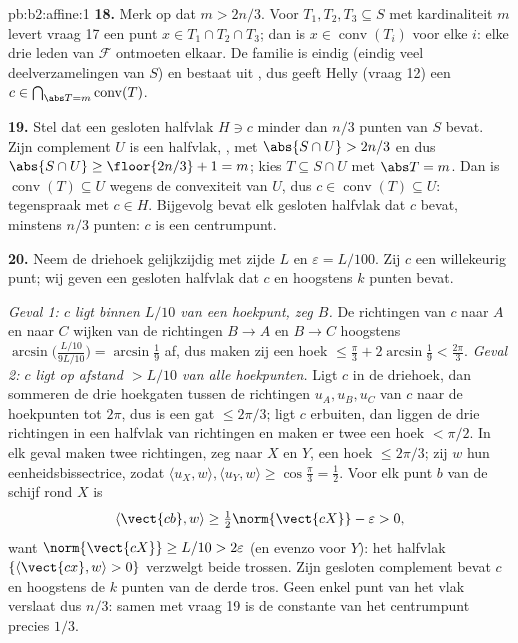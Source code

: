 \begin{solution}{pb:b2:affine:1}
\textbf{18.} Merk op dat $m > 2n/3$. Voor $T_1, T_2, T_3 \subseteq
S$ met kardinaliteit $m$ levert vraag 17 een punt $x \in T_1 \cap
T_2 \cap T_3$; dan is $x \in \operatorname{conv}(T_i)$ voor elke
$i$: elke drie leden van $\mathcal F$ ontmoeten elkaar. De familie
is eindig (eindig veel deelverzamelingen van $S$) en bestaat uit
, dus geeft Helly (vraag 12) een $c \in
\bigcap_{\abs T = m}\operatorname{conv}(T)$.

\textbf{19.} Stel dat een gesloten halfvlak $H \ni c$ minder dan
$n/3$ punten van $S$ bevat. Zijn complement $U$ is een 
halfvlak, , met $\abs{S \cap U} > 2n/3$ en dus $\abs{S \cap
U} \geq \floor{2n/3} + 1 = m$; kies $T \subseteq S \cap U$ met
$\abs T = m$. Dan is $\operatorname{conv}(T) \subseteq U$ wegens de
convexiteit van $U$, dus $c \in \operatorname{conv}(T) \subseteq
U$: tegenspraak met $c \in H$. Bijgevolg bevat elk gesloten
halfvlak dat $c$ bevat, minstens $n/3$ punten: $c$ is een
centrumpunt.

\textbf{20.} Neem de driehoek gelijkzijdig met zijde $L$ en
$\varepsilon = L/100$. Zij $c$ een willekeurig punt; wij geven een
gesloten halfvlak dat $c$ en hoogstens $k$ punten bevat.

\emph{Geval 1: $c$ ligt binnen $L/10$ van een hoekpunt, zeg $B$.}
De richtingen van $c$ naar $A$ en naar $C$ wijken van de richtingen
$B \to A$ en $B \to C$ hoogstens
$\arcsin\bigl(\tfrac{L/10}{9L/10}\bigr) = \arcsin\tfrac19$ af, dus
maken zij een hoek $\leq \tfrac\pi3 + 2\arcsin\tfrac19 <
\tfrac{2\pi}3$. \emph{Geval 2: $c$ ligt op afstand $> L/10$ van
alle hoekpunten.} Ligt $c$ in de driehoek, dan sommeren de drie
hoekgaten tussen de richtingen $u_A, u_B, u_C$ van $c$ naar de
hoekpunten tot $2\pi$, dus is een gat $\leq 2\pi/3$; ligt $c$
erbuiten, dan liggen de drie richtingen in een  halfvlak van
richtingen en maken er twee een hoek $< \pi/2$. In elk geval maken
twee richtingen, zeg naar $X$ en $Y$, een hoek $\leq 2\pi/3$; zij
$w$ hun eenheidsbissectrice, zodat $\langle u_X, w\rangle, \langle
u_Y, w\rangle \geq \cos\tfrac\pi3 = \tfrac12$. Voor elk punt $b$
van de schijf rond $X$ is
\[
\langle \vect{cb}, w\rangle \geq
\tfrac12\norm{\vect{cX}} - \varepsilon > 0,
\]
want $\norm{\vect{cX}} \geq L/10 > 2\varepsilon$ (en evenzo voor
$Y$): het  halfvlak $\{\langle \vect{cx}, w\rangle > 0\}$
verzwelgt beide trossen. Zijn gesloten complement bevat $c$ en
hoogstens de $k$ punten van de derde tros. Geen enkel punt van het
vlak verslaat dus $n/3$: samen met vraag 19 is de constante van het
centrumpunt precies $1/3$.


\end{solution}
